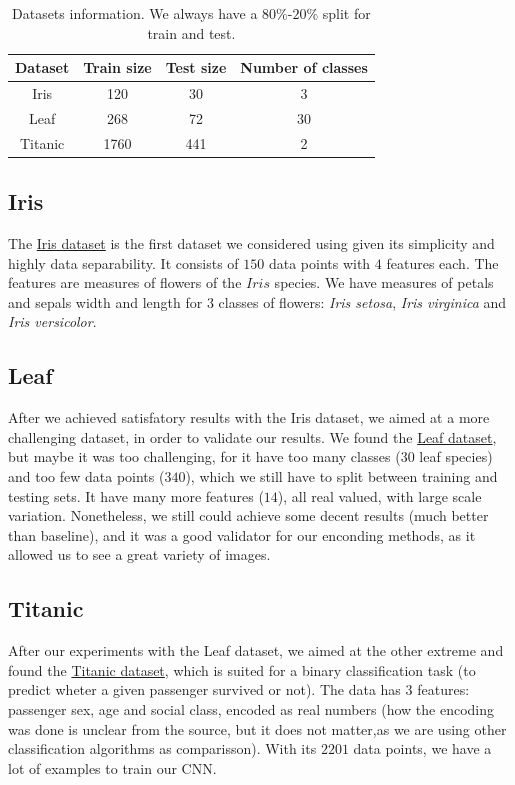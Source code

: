 \documentclass[11pt]{article}
\begin{document}
\begin{table}[htp]
\centering
\begin{tabular}{|c|ccc|}
\hline
	Dataset & Train size & Test size & Number of classes\\ \hline
	Iris & 120 & 30 & 3\\
	Leaf & 268 & 72 & 30\\
	Titanic & 1760 & 441 & 2\\
\hline
\end{tabular}
\caption{Datasets information. We always have a $80\%$-$20\%$ split for train and test.}
\label{table:datasets}
\end{table}


\subsection{Iris}
The  \href{http://archive.ics.uci.edu/ml/datasets/Iris}{Iris dataset} is the first dataset we considered using given its simplicity and highly data separability. It consists of $150$ data points with $4$ features each. The features are measures of flowers of the $Iris$ species. We have measures of petals and sepals width and length for $3$ classes of flowers: \emph{Iris setosa}, \emph{Iris virginica} and \emph{Iris versicolor}.

\subsection{Leaf}

After we achieved satisfatory results with the Iris dataset, we aimed at a more challenging dataset, in order to validate our results. We found the \href{http://archive.ics.uci.edu/ml/datasets/Leaf}{Leaf dataset}, but maybe it was too challenging, for it have too many classes ($30$ leaf species) and too few data points ($340$), which we still have to split between training and testing sets. It have many more features ($14$), all real valued, with large scale variation. Nonetheless, we still could achieve some decent results (much better than baseline), and it was a good validator for our enconding methods, as it allowed us to see a great variety of images.

\subsection{Titanic}

After our experiments with the Leaf dataset, we aimed at the other extreme and found the \href{http://sci2s.ugr.es/keel/dataset.php?cod=189}{Titanic dataset}, which is suited for a binary classification task (to predict wheter a given passenger survived or not). The data has $3$ features: passenger sex, age and social class, encoded as real numbers (how the encoding was done is unclear from the source, but it does not matter,as we are using other classification algorithms as comparisson). With its $2201$ data points, we have a lot of examples to train our CNN.
\end{document}
